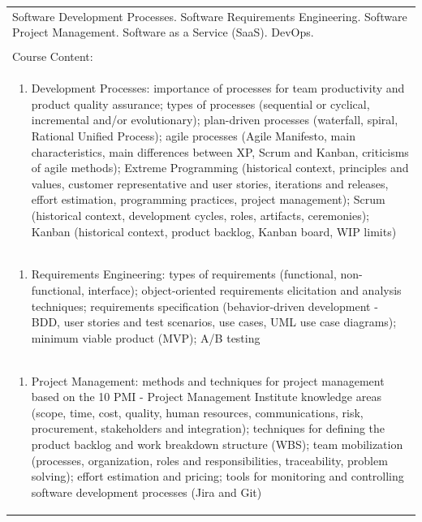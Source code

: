 \documentclass[11pt]{article}
\begin{document}
\begin{center}
\begin{longtable}{|p{4cm}|p{4cm}|p{4cm}|p{4cm}|}
\multicolumn{4}{|p{\dimexpr 16cm + 6\tabcolsep\relax}|}{Software Development Processes. Software Requirements Engineering. Software Project Management. Software as a Service (SaaS). DevOps.}\\
\multicolumn{4}{|p{16cm}|}{}\\
\hline
\multicolumn{4}{|p{16cm}|}{Course Content:}\\*
\multicolumn{4}{|p{\dimexpr 16cm + 6\tabcolsep\relax}|}{\begin{enumerate}[start=1]\item Development Processes: importance of processes for team productivity and product quality assurance; types of processes (sequential or cyclical, incremental and/or evolutionary); plan-driven processes (waterfall, spiral, Rational Unified Process); agile processes (Agile Manifesto, main characteristics, main differences between XP, Scrum and Kanban, criticisms of agile methods); Extreme Programming (historical context, principles and values, customer representative and user stories, iterations and releases, effort estimation, programming practices, project management); Scrum (historical context, development cycles, roles, artifacts, ceremonies); Kanban (historical context, product backlog, Kanban board, WIP limits)\end{enumerate}}\\
\multicolumn{4}{|p{\dimexpr 16cm + 6\tabcolsep\relax}|}{\begin{enumerate}[start=2]\item Requirements Engineering: types of requirements (functional, non-functional, interface); object-oriented requirements elicitation and analysis techniques; requirements specification (behavior-driven development - BDD, user stories and test scenarios, use cases, UML use case diagrams); minimum viable product (MVP); A/B testing\end{enumerate}}\\
\multicolumn{4}{|p{\dimexpr 16cm + 6\tabcolsep\relax}|}{\begin{enumerate}[start=3]\item Project Management: methods and techniques for project management based on the 10 PMI - Project Management Institute knowledge areas (scope, time, cost, quality, human resources, communications, risk, procurement, stakeholders and integration); techniques for defining the product backlog and work breakdown structure (WBS); team mobilization (processes, organization, roles and responsibilities, traceability, problem solving); effort estimation and pricing; tools for monitoring and controlling software development processes (Jira and Git)\end{enumerate}}\\

\end{longtable}
\end{center}
\end{document}
